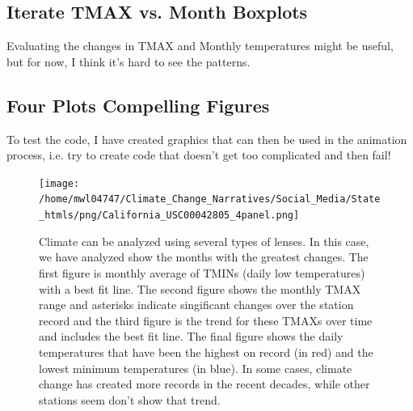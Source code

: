 \documentclass{article}
\begin{document}
\begin{itemize}
\subsection{Iterate TMAX vs. Month Boxplots}

Evaluating the changes in TMAX and Monthly temperatures might be useful, but for now, I think it's hard to see the patterns. 




\subsection{Four Plots Compelling Figures}

To test the code, I have created graphics that can then be used in the animation process, i.e. try to create code that doesn't get too complicated and then fail! 

\begin{knitrout}
\color{fgcolor}\begin{kframe}


{\ttfamily\noindent\bfseries\color{errorcolor}{\#\# Error in seq(min(GSOM\$Year), max(GSOM\$Year), by = 2): object 'GSOM' not found}}

{\ttfamily\noindent\bfseries\color{errorcolor}{\#\# Error in plot.new(): could not open file '/home/mwl04747/Climate\_Change\_Narratives/Social\_Media/State\_htmls/png/California\_USC00042805\_4panel.png'}}

{\ttfamily\noindent\bfseries\color{errorcolor}{\#\# Error in axis(2, at = ytics, labels = ylabs): plot.new has not been called yet}}

{\ttfamily\noindent\bfseries\color{errorcolor}{\#\# Error in axis(1, at = xtics, labels = xlabs): plot.new has not been called yet}}

{\ttfamily\noindent\bfseries\color{errorcolor}{\#\# Error in rect(y1, x1, y2, x2, ...): plot.new has not been called yet}}

{\ttfamily\noindent\bfseries\color{errorcolor}{\#\# Error in rect(y1, x1, y2, x2, ...): plot.new has not been called yet}}\end{kframe}
\end{knitrout}

\begin{figure}
\texttt{[image: /home/mwl04747/Climate\_Change\_Narratives/Social\_Media/State\_htmls/png/California\_USC00042805\_4panel.png]}
\caption{Climate can be analyzed using several types of lenses. In this case, we have analyzed show the months with the greatest changes. The first figure is monthly average of TMINs (daily low temperatures) with a best fit line. The second figure shows the monthly TMAX range and asterisks indicate singificant changes over the station record and the third figure is the trend for these TMAXs over time and includes the best fit line. The final figure shows the daily temperatures that have been the highest on record (in red) and the lowest minimum temperatures (in blue). In some cases, climate change has created more records in the recent decades, while other stations seem don't show that trend.}
\label{fig:4panel}
\end{figure}


\end{itemize}
\end{document}
